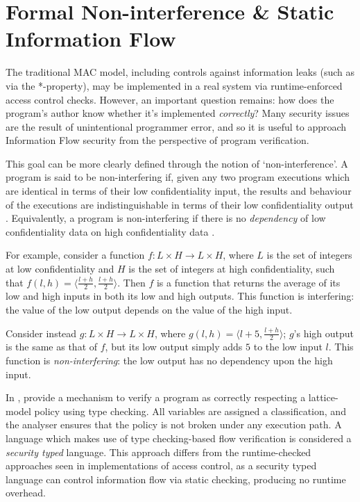 \section{Formal Non-interference \& Static Information Flow} \label{theory_if_noninterference}

The traditional MAC model, including controls against information leaks (such as via the *-property), may be implemented in a real system via runtime-enforced access control checks. However, an important question remains: how does the program's author know whether it's implemented \textit{correctly}? Many security issues are the result of unintentional programmer error, and so it is useful to approach Information Flow security from the perspective of program verification.

This goal can be more clearly defined through the notion of `non-interference'. A program is said to be non-interfering if, given any two program executions which are identical in terms of their low confidentiality input, the results and behaviour of the executions are indistinguishable in terms of their low confidentiality output \cite{sabelfeld2003if}. Equivalently, a program is non-interfering if there is no \textit{dependency} of low confidentiality data on high confidentiality data \cite{cohen1977declassification}.

For example, consider a function $ f: L \times H \rightarrow L \times H $, where $ L $ is the set of integers at low confidentiality and $ H $ is the set of integers at high confidentiality, such that $ f(l, h) = \langle \frac{l + h}{2}, \frac{l + h}{2} \rangle $. Then $ f $ is a function that returns the average of its low and high inputs in both its low and high outputs. This function is interfering: the value of the low output depends on the value of the high input.

Consider instead $ g: L \times H \rightarrow L \times H $, where $ g(l, h) = \langle l + 5, \frac{l + h}{2} \rangle $; $ g $'s high output is the same as that of $ f $, but its low output simply adds $ 5 $ to the low input $ l $. This function is \textit{non-interfering}: the low output has no dependency upon the high input.

In , \citeauthor{denning1977certification} \cite{denning1977certification} provide a mechanism to verify a program as correctly respecting a lattice-model policy using type checking. All variables are assigned a classification, and the analyser ensures that the policy is not broken under any execution path. A language which makes use of type checking-based flow verification is considered a \textit{security typed} language. This approach differs from the runtime-checked approaches seen in implementations of access control, as a security typed language can control information flow via static checking, producing no runtime overhead.

